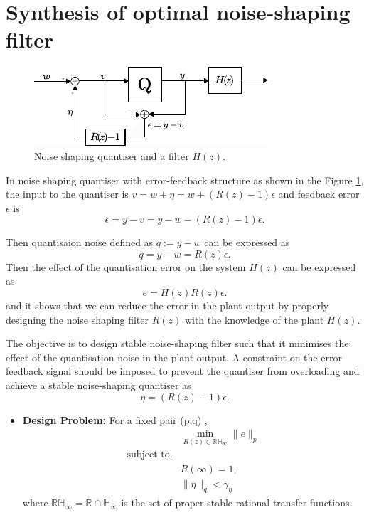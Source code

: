 \documentclass[a4paper]{article}
\begin{document}
\newpage
\section{Synthesis of optimal noise-shaping filter}

\begin{figure}[!h]
	\centering
	\includegraphics[scale = 2]{figures/nsq_error_feedback.pdf}
	\caption{Noise shaping quantiser and a filter $H(z)$.}
	\label{fig:nsq_efs}
\end{figure}
In noise shaping quantiser with error-feedback structure as shown in the Figure \ref{fig:nsq_efs}, the input to the quantiser is  $v = w + \eta = w + (R(z)-1)\epsilon$
and  feedback error $\epsilon$ is 
\begin{equation}
	\epsilon = y - v = y - w - (R(z)-1)\epsilon.
\end{equation}

Then quantisaion noise defined as $q := y - w$ can be expressed as 
\begin{equation}
	 q = y - w = R(z) \epsilon.
\end{equation}
Then the effect of the quantisation error on the system $H(z)$ can be expressed as 
\begin{equation}	
	 e = H(z) R(z) \epsilon.
	 \label{eq:err_plant}
\end{equation}
and it shows that we can reduce the error in the plant output by properly designing the noise shaping filter $R(z)$ with the knowledge of the plant $H(z)$. 

The objective is to design stable noise-shaping filter such that it minimises the effect of the quantisation noise in the plant output. A constraint on the error feedback signal should be imposed to prevent the quantiser from overloading and achieve a stable noise-shaping quantiser as $$ \eta = (R(z) - 1) \epsilon.$$

\begin{itemize}
	\item \textbf{Design Problem:} For a fixed pair (p,q) \cite{Shuichi2017}, 
	\begin{equation}
		\begin{aligned}
			&\min_{R(z) \in \mathbb{RH}_{\infty}} \| e \|_{p}  \\
			\textrm{subject  to.}& \\
			& R(\infty)	 = 1, \\
			& \|\eta\|_{q} < \gamma_{\eta}
		\end{aligned}	
	\end{equation}	
	where $\mathbb{RH}_{\infty} = \mathbb{R} \cap \mathbb{H}_{\infty}$ is the set of proper stable rational transfer functions.
\end{itemize}
\end{document}
